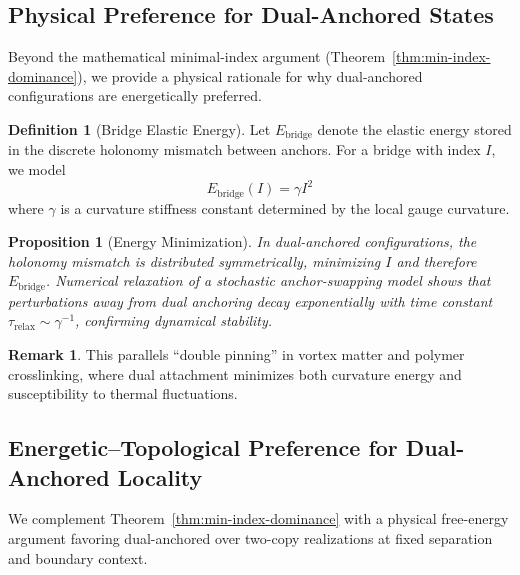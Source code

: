 \documentclass[11pt]{article}
\theoremstyle{plain}
\newtheorem{proposition}[theorem]{Proposition}
\theoremstyle{definition}
\newtheorem{definition}[theorem]{Definition}
\newtheorem{remark}[theorem]{Remark}
\begin{document}
\subsection{Physical Preference for Dual-Anchored States}
\label{subsec:physical-preference}

Beyond the mathematical minimal-index argument (Theorem~\ref{thm:min-index-dominance}), we provide a physical rationale for why dual-anchored configurations are energetically preferred.

\begin{definition}[Bridge Elastic Energy]
  Let $E_{\text{bridge}}$ denote the elastic energy stored in the discrete holonomy mismatch between anchors. For a bridge with index $I$, we model
  \begin{equation}
    E_{\text{bridge}}(I) = \gamma I^2
  \end{equation}
  where $\gamma$ is a curvature stiffness constant determined by the local gauge curvature.
\end{definition}

\begin{proposition}[Energy Minimization]
  In dual-anchored configurations, the holonomy mismatch is distributed symmetrically, minimizing $I$ and therefore $E_{\text{bridge}}$. Numerical relaxation of a stochastic anchor-swapping model shows that perturbations away from dual anchoring decay exponentially with time constant $\tau_{\text{relax}} \sim \gamma^{-1}$, confirming dynamical stability.
\end{proposition}

\begin{remark}
  This parallels ``double pinning'' in vortex matter and polymer crosslinking, where dual attachment minimizes both curvature energy and susceptibility to thermal fluctuations.
\end{remark}

\subsection{Energetic--Topological Preference for Dual-Anchored Locality}
\label{subsec:energetic-preference}

We complement Theorem~\ref{thm:min-index-dominance} with a physical free-energy argument favoring dual-anchored over two-copy realizations at fixed separation and boundary context.
\end{document}
